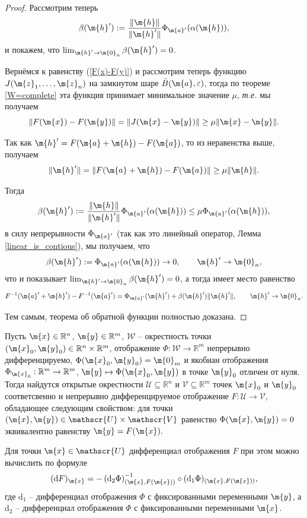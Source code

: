 \begin{proof}
Рассмотрим теперь 
\[
 \beta(\m{h}'): = \frac{\|\m{h}\|}{\| \m{h}'\|}\Phi_{\m{a}'}(\alpha(\m{h})) ,
\]
и покажем, что $\lim_{\m{h}' \to \m{0}_n} \beta(\m{h}') = 0$.

Вернёмся к равенству (\ref{F(x)-F(y)}) и рассмотрим теперь функцию $J(\m{z}_1,\ldots, \m{z}_n)$ на замкнутом шаре $\bar B(\m{a},\varepsilon)$, тогда по теореме \ref{W=complete} эта функция принимает минимальное значение $\mu$, \textit{т.е.} мы получаем
\[
 \| F(\m{x}) - F(\m{y})\| = \| J(\m{x}-\m{y})\| \ge \mu \|\m{x} - \m{y}\|.
\]

Так как $\m{h}'= F(\m{a} + \m{h}) - F(\m{a})$, то из неравенства выше, получаем
\[
  \| \m{h}'\| =\| F(\m{a} + \m{h}) - F(\m{a}) \| \ge  \mu \| \m{h} \|.
\]

Тогда
\[
 \beta(\m{h}'): = \frac{\|\m{h}\|}{\| \m{h}'\|}\Phi_{\m{a}'}(\alpha(\m{h})) \le \mu \Phi_{\m{a}'}(\alpha(\m{h})),
\]
в силу непрерывности $\Phi_{\m{a}'}$ (так как это линейный оператор, Лемма \ref{linear_is_contious}), мы получаем, что 
\[
 \beta(\m{h}'): = \Phi_{\m{a}'}(\alpha(\m{h})) \to 0, \qquad \m{h}' \to \m{0}_n,
\]
что и показывает $\lim_{\m{h}' \to \m{0}_n} \beta(\m{h}') = 0$, а тогда имеет место равенство 
\[
 F^{-1}(\m{a}' + \m{h}') - F^{-1}(\m{a}') = \Phi_{\m{a}'}(\m{h}') + \beta(\m{h}') \| \m{h}'\|, \qquad \m{h}' \to \m{0}_n.
\]

Тем самым, теорема об обратной функции полностью доказана.
\end{proof}


\begin{theorem}\label{implicit_theorem}
    Пусть $\m{x} \in \mathbb{R}^n$, $\m{y} \in \mathbb{R}^m$, $\mathscr{W}$ -- окрестность точки $(\m{x}_0, \m{y}_0) \in \mathbb{R}^n \times \mathbb{R}^m$, отображение $\Phi: \mathscr{W} \to \mathbb{R}^m$ непрерывно дифференцируемо, $\Phi(\m{x}_0, \m{y}_0) = \m{0}_m$ и якобиан отображения  $\Phi_{\m{x}_0}: \mathbb{R}^m \to \mathbb{R}^m$, $\m{y}\mapsto \Phi(\m{x}_0, \m{y})$ в точке $\m{y}_0$ отличен от нуля. Тогда найдутся открытые окрестности $\mathscr{U} \subseteq \mathbb{R}^n$ и $\mathscr{V} \subseteq \mathbb{R}^m$ точек $\m{x}_0$ и $\m{y}_0$ соответсвенно и непрерывно дифференцируемое отображение $F: \mathscr{U} \to \mathscr{V}$, обладающее следующим свойством: для точки $(\m{x}, \m{y}) \in \mathscr{U} \times \mathscr{V}$ равенство $\Phi(\m{x}, \m{y}) = 0$ эквивалентно равенству $\m{y} = F(\m{x}).$

    Для точки $\m{x} \in \mathscr{U}$ дифференциал отображения $F$ при этом можно вычислить по формуле
    \[
     (\mathrm{d}F)_\m{x} = - \left( \mathrm{d}_2 \Phi \right)^{-1}_{(\m{x}, F(\m{x}))} \circ (\mathrm{d}_1 \Phi)_{(\m{x}, F(\m{x}))},
    \]
    где $\mathrm{d}_1$ -- дифференциал отображения $\Phi$ с фиксированными переменными $\m{y}$, а $\mathrm{d}_2$ -- дифференциал отображения $\Phi$ с фиксированными переменными $\m{x}$.
\end{theorem}


